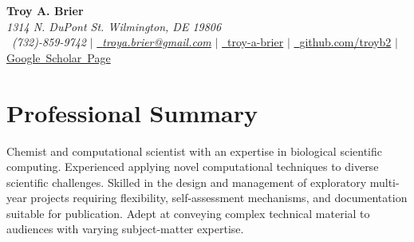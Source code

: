 \documentclass[letterpaper,10pt]{article}
\makeatletter
\newcommand{\sectionspace}{
\vspace{-17pt}
}
\newcommand{\subheadingtitlevspace}{
\vspace{-3pt}
}
\newcommand{\titleItem}[1]{
  \textbf{#1}
}
\newcommand{\resumeProjectHeading}[2]{
    \item
    \begin{tabular*}{0.97\textwidth}{l@{\extracolsep{\fill}}r}
      #1 & \textit{ #2} \\
    \end{tabular*}\vspace{-9pt}
}
\newcommand{\resumeSubHeadingListStart}{\subheadingtitlevspace\begin{itemize}[leftmargin=0.15in, label={}]}
\newcommand{\resumeSubHeadingListEnd}{\end{itemize}}
\makeatother
\begin{document}
\begin{flushleft}
    \textbf{\LARGE Troy A. Brier} \\    
    \textcolor{color1}{\textit{1314 N. DuPont St. Wilmington, DE 19806}} \\
    \Mobilefone~\textcolor{color1}{\textit{(732)-859-9742}} {\large $|$}
    \href{mailto:troya.brier@gmail.com}{{\Letter~\textcolor{color1}{\textit{troya.brier@gmail.com}}}}
    {\large $|$}
    \href{https://www.linkedin.com/in/troy-a-brier/}{\faLinkedin~\textcolor{color1}{troy-a-brier}}
    {\large $|$}
    \href{https://github.com/troyb2}{\Keyboard~\textcolor{color1}{github.com/troyb2}}
    {\large $|$}
    \href{https://scholar.google.com/citations?user=DyTEVjEAAAAJ&hl=en}{\textcolor{color1}{Google~Scholar~Page}}
    \vspace{-8pt}
\end{flushleft}

\section{\textcolor{color1}{Professional Summary}}
\vspace{-3pt}
\begin{itemize}[leftmargin=0.15in, label={}]
    {\item{
        {Chemist and computational scientist with an expertise in biological scientific computing.
         Experienced applying novel computational techniques to diverse scientific challenges.
         Skilled in the design and management of exploratory multi-year projects requiring flexibility, self-assessment mechanisms, and documentation suitable for publication.
         Adept at conveying complex technical material to audiences with varying subject-matter expertise.
        } \\
    }}
 \end{itemize}
 \sectionspace
\vspace{3pt}


          
\end{document}
